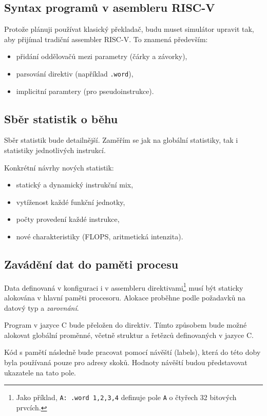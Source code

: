 \subsection{Syntax programů v asembleru RISC-V}
\label{riscvSyntax}

Protože plánuji používat klasický překladač, budu muset simulátor upravit tak, aby přijímal tradiční assembler RISC-V.
To znamená především:
\begin{itemize}
    \item přidání oddělovačů mezi parametry (čárky a závorky),
    \item parsování direktiv (například \texttt{.word}),
    \item implicitní paramtery (pro pseudoinstrukce).
\end{itemize}

\subsection{Sběr statistik o běhu}
\label{statsCollection}

Sběr statistik bude detailnější.
Zaměřím se jak na globální statistiky, tak i statistiky jednotlivých instrukcí.

Konkrétní návrhy nových statistik:
\begin{itemize}
    \item statický a dynamický instrukční mix,
    \item vytíženost každé funkční jednotky,
    \item počty provedení každé instrukce,
    \item nové charakteristiky (FLOPS, aritmetická intenzita).
\end{itemize}

\subsection{Zavádění dat do paměti procesu}
\label{memloader}

Data definovaná v konfiguraci i v assembleru direktivami\footnote{Jako příklad, \texttt{A: .word 1,2,3,4} definuje pole \texttt{A} o čtyřech 32 bitových prvcích.} musí být staticky alokována v hlavní paměti procesoru.
Alokace proběhne podle požadavků na datový typ a \emph{zarovnání}.

Program v jazyce C bude přeložen do direktiv.
Tímto způsobem bude možné alokovat globální proměnné, včetně struktur a řetězců definovaných v jazyce C.

Kód s pamětí následně bude pracovat pomocí návěští (labels), která do této doby byla používaná pouze pro adresy skoků.
Hodnoty návěští budou představovat ukazatele na tato pole.

